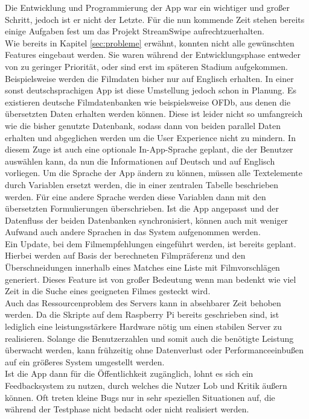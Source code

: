 Die Entwicklung und Programmierung der App war ein wichtiger und großer Schritt, jedoch ist er nicht der Letzte. Für die nun kommende Zeit stehen bereits einige Aufgaben fest um das Projekt StreamSwipe aufrechtzuerhalten.\\
Wie bereits in Kapitel \ref{sec:probleme} erwähnt, konnten nicht alle gewünschten Features eingebaut werden. Sie waren während der Entwicklungsphase entweder von zu geringer Priorität, oder sind erst im späteren Stadium aufgekommen. Beispielsweise werden die Filmdaten bisher nur auf Englisch erhalten. In einer sonst deutschsprachigen App ist diese Umstellung jedoch schon in Planung. Es existieren deutsche Filmdatenbanken wie beispielsweise OFDb, aus denen die übersetzten Daten erhalten werden können. Diese ist leider nicht so umfangreich wie die bisher genutzte Datenbank, sodass dann von beiden parallel Daten erhalten und abgeglichen werden um die User Experience nicht zu mindern.  In diesem Zuge ist auch eine optionale In-App-Sprache geplant, die der Benutzer auswählen kann, da nun die Informationen auf Deutsch und auf Englisch vorliegen. Um die Sprache der App ändern zu können, müssen alle Textelemente durch Variablen ersetzt werden, die in einer zentralen Tabelle beschrieben werden. Für eine andere Sprache werden diese Variablen dann mit den übersetzten Formulierungen überschrieben. Ist die App angepasst und der Datenfluss der beiden Datenbanken synchronisiert, können auch mit weniger Aufwand auch andere Sprachen in das System aufgenommen werden.\\

\noindent
Ein Update, bei dem Filmempfehlungen eingeführt werden, ist bereits geplant. Hierbei werden auf Basis der berechneten Filmpräferenz und den Überschneidungen innerhalb eines Matches eine Liste mit Filmvorschlägen generiert. Dieses Feature ist von großer Bedeutung wenn man bedenkt wie viel Zeit in die Suche eines geeigneten Filmes gesteckt wird.\\
Auch das Ressourcenproblem des Servers kann in absehbarer Zeit behoben werden. Da die Skripte auf dem Raspberry Pi bereits geschrieben sind, ist lediglich eine leistungsstärkere Hardware nötig um einen stabilen Server zu realisieren. Solange die Benutzerzahlen und somit auch die benötigte Leistung überwacht werden, kann frühzeitig ohne Datenverlust oder Performanceeinbußen auf ein größeres System umgestellt werden.\\
Ist die App dann für die Öffentlichkeit zugänglich, lohnt es sich ein Feedbacksystem zu nutzen, durch welches die Nutzer Lob und Kritik äußern können. Oft treten kleine Bugs nur in sehr speziellen Situationen auf, die während der Testphase nicht bedacht oder nicht realisiert werden. \\

